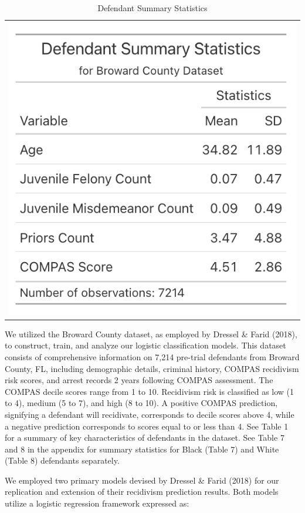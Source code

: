 \documentclass[12pt, ]{article}
\begin{document}
\hypertarget{tbl-1}{}
\begin{longtable}[]{@{}l@{}}
\caption{\label{tbl-1}Defendant Summary Statistics}\tabularnewline
\toprule\noalign{}
\endfirsthead
\endhead
\bottomrule\noalign{}
\endlastfoot
\includegraphics{tables/tbl1.png} \\
\end{longtable}

We utilized the Broward County dataset, as employed by Dressel \& Farid
(2018), to construct, train, and analyze our logistic classification
models. This dataset consists of comprehensive information on 7,214
pre-trial defendants from Broward County, FL, including demographic
details, criminal history, COMPAS recidivism risk scores, and arrest
records 2 years following COMPAS assessment. The COMPAS decile scores
range from 1 to 10. Recidivism risk is classified as low (1 to 4),
medium (5 to 7), and high (8 to 10). A positive COMPAS prediction,
signifying a defendant will recidivate, corresponds to decile scores
above 4, while a negative prediction corresponds to scores equal to or
less than 4. See Table 1 for a summary of key characteristics of
defendants in the dataset. See Table 7 and 8 in the appendix for summary
statistics for Black (Table 7) and White (Table 8) defendants
separately.

We employed two primary models devised by Dressel \& Farid (2018) for
our replication and extension of their recidivism prediction results.
Both models utilize a logistic regression framework expressed as:
\end{document}
